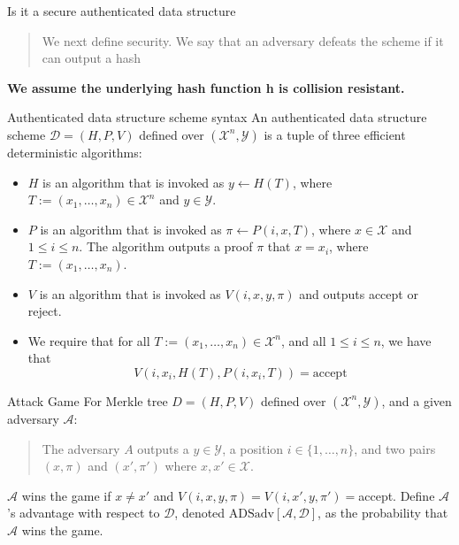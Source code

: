 \documentclass{beamer}
\begin{document}

\begin{frame}{Is it a secure authenticated data structure}
	\begin{quote}
		We next define security. We say that an adversary defeats the scheme if it can output a hash

	\end{quote}

	
	\textbf{We assume the underlying hash function h is collision resistant.}
\end{frame}


\begin{frame}{Authenticated data structure scheme syntax}
	An authenticated data structure scheme $\mathcal{D} = (H, P, V )$ defined over $(\mathcal{X}^{n}, \mathcal{Y})$
	is a tuple of three efficient deterministic algorithms:
	\begin{itemize}
		\item $H$ is an algorithm that is invoked as $y \leftarrow H(T)$, where $T := (x_1,\ldots , x_n) \in \mathcal{X}^n$ and $y \in \mathcal{Y}$.
		\item $P$ is an algorithm that is invoked as $\pi \leftarrow P(i, x, T)$, where $x \in \mathcal{X}$ and $1 \leq i \leq n$. The
		algorithm outputs a proof $\pi$ that $x = x_i$, where $T := (x_1, \ldots , x_n)$.
		\item $V$ is an algorithm that is invoked as $V (i, x, y, \pi)$ and outputs accept or reject.
		\item We require that for all $T := (x_1,\ldots , x_n) \in \mathcal{X}^n$, and all $1 \leq i \leq n$, we have that
		$$
		V(i, x_i	, H(T), P(i, x_i, T))  = \mathrm{accept}
		$$
	\end{itemize}
\end{frame}

\begin{frame}{Attack Game}
	For Merkle tree $D = (H, P, V )$ defined over $(\mathcal{X}^{n}, \mathcal{Y})$, and a given adversary $\mathcal{A}$: 
	
	\begin{quote}
		The adversary $A$ outputs a $y \in \mathcal{Y}$, a position $i \in \{1, \ldots , n\}$, and two pairs $(x, \pi)$ and $(x', \pi')$ where $x, x' \in \mathcal{X}$.
	\end{quote}

$\mathcal{A}$ wins the game if $x \neq x'$ and $V(i, x, y, \pi)=V(i, x', y, \pi')=$accept. Define $\mathcal{A}$'s advantage with respect to $\mathcal{D}$, denoted $\mathrm{ADSadv}[\mathcal{A}, \mathcal{D}]$, as the probability that $\mathcal{A}$ wins the game. 
\end{frame}
\end{document}
